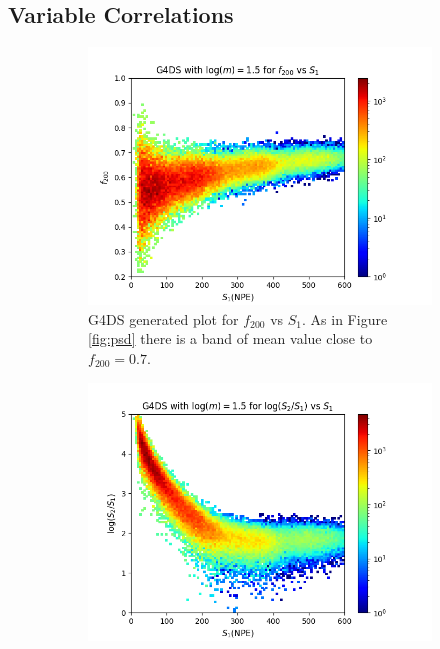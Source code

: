 \documentclass[11pt]{article} %
\begin{document}
\subsection{Variable Correlations}
\begin{figure}[H]
\centering
\begin{minipage}{\textwidth}
  \begin{subfigure}{.5\textwidth}
      \centering\captionsetup{width=.8\linewidth}%
      \includegraphics[scale=0.5]{./images/1.5/g4_f200_vs_s1.png}
      \caption{G4DS generated plot for $f_{200}$ vs $S_1$. As in Figure \ref{fig:psd} there is a band of mean value close to $f_{200}=0.7$.}
  \end{subfigure}
  \begin{subfigure}{.5\textwidth}
      \centering\captionsetup{width=.8\linewidth}%
      \includegraphics[scale=0.5]{./images/1.5/g4_s1_over_s2_vs_s1.png}

\end{subfigure}
\end{minipage}
\end{figure}
\end{document}
